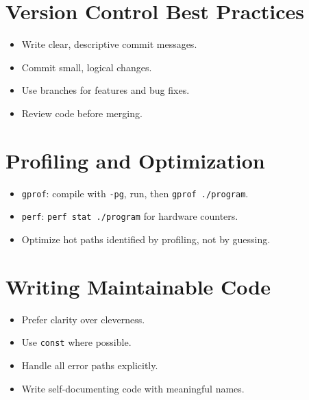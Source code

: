 \documentclass[11pt,a4paper]{article}
\begin{document}
\section{Version Control Best Practices}
\begin{itemize}
  \item Write clear, descriptive commit messages.
  \item Commit small, logical changes.
  \item Use branches for features and bug fixes.
  \item Review code before merging.
\end{itemize}

\section{Profiling and Optimization}
\begin{itemize}
  \item \texttt{gprof}: compile with \texttt{-pg}, run, then \texttt{gprof ./program}.
  \item \texttt{perf}: \texttt{perf stat ./program} for hardware counters.
  \item Optimize hot paths identified by profiling, not by guessing.
\end{itemize}

\section{Writing Maintainable Code}
\begin{itemize}
  \item Prefer clarity over cleverness.
  \item Use \texttt{const} where possible.
  \item Handle all error paths explicitly.
  \item Write self-documenting code with meaningful names.
\end{itemize}
\end{document}

